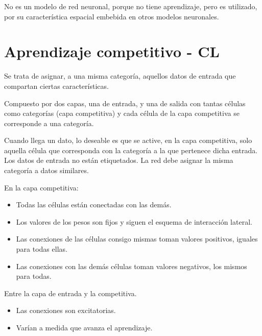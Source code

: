 \documentclass[12pt, twoside, openright]{report} %
\begin{document}
No es un modelo de red neuronal, porque no tiene aprendizaje, pero es utilizado, por su característica espacial embebida en otros modelos neuronales.

\section{Aprendizaje competitivo - CL}
Se trata de asignar, a una misma categoría, aquellos datos de entrada que compartan ciertas características.

Compuesto por dos capas, una de entrada, y una de salida con tantas células como categorías (capa competitiva) y cada célula de la capa competitiva se corresponde a una categoría.

Cuando llega un dato, lo deseable es que se active, en la capa competitiva, solo aquella célula que corresponda con la categoría a la que pertenece dicha entrada. Los datos de entrada no están etiquetados. La red debe asignar la misma categoría a datos similares.

En la capa competitiva:
\begin{itemize}
	\item Todas las células están conectadas con las demás.
	\item Los valores de los pesos son fijos y siguen el esquema de interacción lateral.
	\item Las conexiones de las células consigo mismas toman valores positivos, iguales para todas ellas.
	\item Las conexiones con las demás células toman valores negativos, los mismos para todas.
\end{itemize}

Entre la capa de entrada y la competitiva.
\begin{itemize}
	\item Las conexiones son excitatorias.
	\item Varían a medida que avanza el aprendizaje.
\end{itemize}
\end{document}
